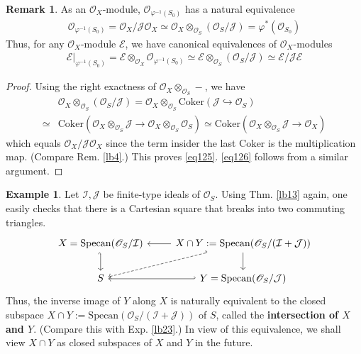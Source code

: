 \documentclass[12pt,b5paper,notitlepage]{report}
\theoremstyle{definition}
\newtheorem{eg}[df]{Example}
\newtheorem{rem}[df]{Remark}
\theoremstyle{plain}
\newcommand{\mc}{\mathcal}
\newcommand{\scr}{\mathscr}
\newcommand{\Cok}{\mathrm{Coker}}
\newcommand{\Specan}{\mathrm{Specan}}
\numberwithin{equation}{section}
\begin{document}
\begin{rem}\label{lb58}
As an $\scr O_X$-module, $\scr O_{\varphi^{-1}(S_0)}$ has a natural equivalence
\begin{align}\label{eq125}
\scr O_{\varphi^{-1}(S_0)}=\scr O_X/\mc J\scr O_X\simeq \scr O_X\otimes_{\scr O_S}(\scr O_S/\mc J)=\varphi^*(\scr O_{S_0})
\end{align}
Thus, for any $\scr O_X$-module $\scr E$, we have canonical equivalences of $\scr O_X$-modules
\begin{align}\label{eq126}
\scr E|_{\varphi^{-1}(S_0)}=\scr E\otimes_{\scr O_X}\scr O_{\varphi^{-1}(S_0)}\simeq  \scr E\otimes_{\scr O_S}(\scr O_S/\mc J)\simeq\scr E/\mc J\scr E
\end{align}
\end{rem}
\begin{proof}
Using the right exactness of $\scr O_X\otimes_{\scr O_S}-$, we have
\begin{align*}
&\scr O_X\otimes_{\scr O_S}(\scr O_S/\mc J)=\scr O_X\otimes_{\scr O_S}\Cok(\mc J\hookrightarrow\scr O_S)\\
\simeq &\Cok (\scr O_X\otimes_{\scr O_S}\mc J\rightarrow \scr O_X\otimes_{\scr O_S}\scr O_S)\simeq \Cok(\scr O_X\otimes_{\scr O_S}\mc J\rightarrow\scr O_X)
\end{align*}
which equals $\scr O_X/\mc J\scr O_X$ since the term insider the last $\Cok$ is the multiplication map. (Compare Rem. \ref{lb4}.) This proves \eqref{eq125}. \eqref{eq126} follows from a similar argument.
\end{proof}


\begin{eg}\label{lb79}
Let $\mc I,\mc J$ be finite-type ideals of $\scr O_S$. Using Thm. \ref{lb13} again, one easily checks that there is a  Cartesian square that breaks into two commuting triangles.
\begin{equation}
\begin{tikzcd}
X=\Specan(\scr O_S/\mc I) \arrow[d,hook'] & X\cap Y:=\Specan(\scr O_S/(\mc I+\mc J)) \arrow[d] \arrow[l] \arrow[ld, dashed, hook']\\
S           &Y= \Specan(\scr O_S/\mc J) \arrow[l, hook']          
\end{tikzcd}
\end{equation}
Thus, the inverse image of $Y$ along $X$ is naturally equivalent to the closed subspace $X\cap Y:=\Specan(\scr O_S/(\mc I+\mc J))$ of $S$, called the \textbf{intersection of $X$ and $Y$}.  (Compare this with Exp. \ref{lb23}.) In view of this equivalence, we shall view $X\cap Y$ as closed subspaces of $X$ and $Y$ in the future.
\end{eg}
\end{document}
